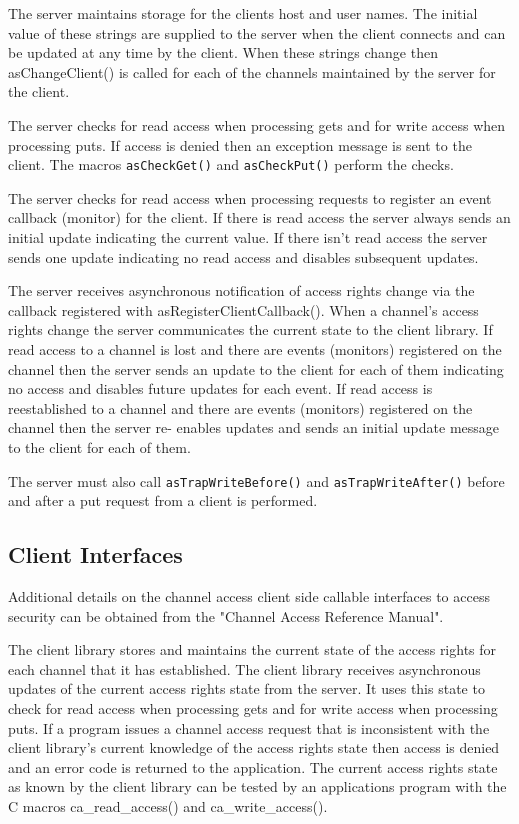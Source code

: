 The server maintains storage for the clients host and user names. The initial value of these strings are supplied to the 
server when the client connects and can be updated at any time by the client. When these strings change then 
asChangeClient() is called for each of the channels maintained by the server for the client.

The server checks for read access when processing gets and for write access when processing puts. If access is denied 
then an exception message is sent to the client. The macros \verb|asCheckGet()| and \verb|asCheckPut()| perform the checks.

The server checks for read access when processing requests to register an event callback (monitor) for the client. If there 
is read access the server always sends an initial update indicating the current value. If there isn't read access the server 
sends one update indicating no read access and disables subsequent updates.

The server receives asynchronous notification of access rights change via the callback registered with 
asRegisterClientCallback(). When a channel's access rights change the server communicates the current state 
to the client library. If read access to a channel is lost and there are events (monitors) registered on the channel then the 
server sends an update to the client for each of them indicating no access and disables future updates for each event. If 
read access is reestablished to a channel and there are events (monitors) registered on the channel then the server re-
enables updates and sends an initial update message to the client for each of them.

The server must also call \verb|asTrapWriteBefore()| and \verb|asTrapWriteAfter()| before and after a put request from a 
client is performed.

\subsection{Client Interfaces}

Additional details on the channel access client side callable interfaces to access security can be obtained from the 
"Channel Access Reference Manual".

The client library stores and maintains the current state of the access rights for each channel that it has established. The 
client library receives asynchronous updates of the current access rights state from the server. It uses this state to check for 
read access when processing gets and for write access when processing puts. If a program issues a channel access request 
that is inconsistent with the client library's current knowledge of the access rights state then access is denied and an error 
code is returned to the application. The current access rights state as known by the client library can be tested by an 
applications program with the C macros ca\_read\_access() and ca\_write\_access().

